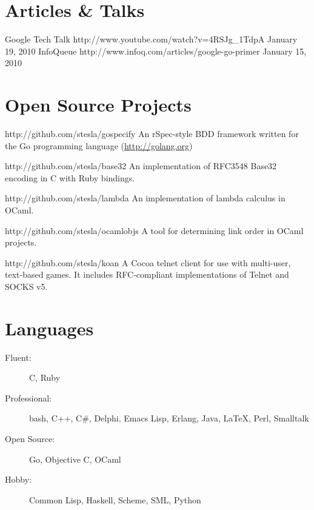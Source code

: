 \documentclass{resume}
\begin{document}
\section{Articles \& Talks}
\begin{itemize}
       {Google Tech Talk}
       {http://www.youtube.com/watch?v=4RSJg_1TdpA}
       {January 19, 2010}
          {InfoQueue}
          {http://www.infoq.com/articles/google-go-primer}
          {January 15, 2010}
\end{itemize}

\section{Open Source Projects}
\begin{itemize}
             {http://github.com/stesla/gospecify}
             An rSpec-style BDD framework written for the Go programming language (\url{http://golang.org})

             {http://github.com/stesla/base32}
             An implementation of RFC3548 Base32 encoding in C with Ruby
             bindings.

             {http://github.com/stesla/lambda}
             An implementation of lambda calculus in OCaml.

             {http://github.com/stesla/ocamlobjs}
             A tool for determining link order in OCaml projects.

             {http://github.com/stesla/koan}
             A Cocoa telnet client for use with multi-user, text-based
             games. It includes RFC-compliant implementations of Telnet and
             SOCKS v5.
\end{itemize}

\section{Languages}
\begin{description}
\item[Fluent:] C, Ruby
\item[Professional:] bash, C++, C\#, Delphi, Emacs Lisp, Erlang, Java, \LaTeX, Perl, Smalltalk
\item[Open Source:] Go, Objective C, OCaml
\item[Hobby:] Common Lisp, Haskell, Scheme, SML, Python
\end{description}
\end{document}
